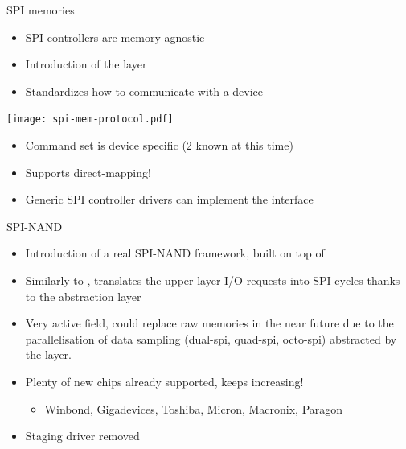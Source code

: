 \documentclass[aspectratio=169,obeyspaces,spaces,hyphens,dvipsnames]{beamer}
\begin{document}
\begin{frame}{SPI memories}
  \begin{itemize}
  \item SPI controllers are memory agnostic
  \item Introduction of the  layer
  \item Standardizes how to communicate with a device
  \end{itemize}
  \vfill
  \texttt{[image: spi-mem-protocol.pdf]}
  \vfill
  \begin{itemize}
  \item Command set is device specific (2 known at this time)
  \item Supports direct-mapping!
  \item Generic SPI controller drivers can implement the
     interface
  \end{itemize}
\end{frame}

\begin{frame}{SPI-NAND}
  \begin{itemize}
  \item Introduction of a real SPI-NAND framework, built on top of
  \item Similarly to , translates the upper layer
    I/O requests into SPI cycles thanks to the  abstraction
    layer
    \vfill
  \item Very active field, could replace raw memories in the near future
    due to the parallelisation of data sampling (dual-spi, quad-spi,
    octo-spi) abstracted by the  layer.
  \item Plenty of new chips already supported, keeps increasing!
    \begin{itemize}
    \item Winbond, Gigadevices, Toshiba, Micron, Macronix, Paragon
    \end{itemize}
    \vfill
  \item Staging  driver removed
  \end{itemize}
\end{frame}
\end{document}
